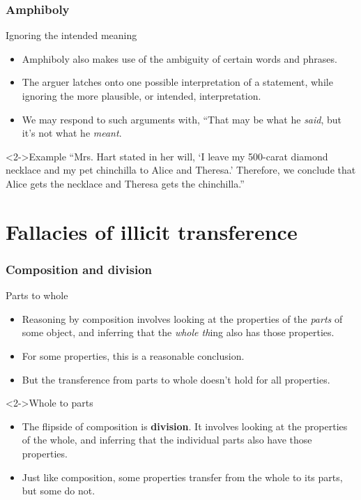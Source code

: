 \documentclass[10pt,letterpaper,xcolor=dvipsnames]{beamer}
\begin{document}
\begin{frame}
  \frametitle{Amphiboly}
  
  \begin{block}{Ignoring the intended meaning}
    \begin{itemize}
      \item Amphiboly also makes use of the ambiguity of certain words and phrases.
      \item The arguer latches onto one possible interpretation of a statement, while ignoring the more plausible, or intended, interpretation.
      \item We may respond to such arguments with, ``That may be what he \textit{said}, but it's not what he \textit{meant}.
    \end{itemize}
  \end{block}
  
  \begin{block}<2->{Example}
    ``Mrs. Hart stated in her will, `I leave my 500-carat diamond necklace and my pet chinchilla to Alice and Theresa.' Therefore, we conclude that Alice gets the necklace and Theresa gets the chinchilla.''
  \end{block}

  
\end{frame}


\section{Fallacies of illicit transference}

\begin{frame}
  \frametitle{Composition and division}
  
  \begin{block}{Parts to whole}
    \begin{itemize}
      \item Reasoning by composition involves looking at the properties of the \textit{parts} of some object, and inferring that the \textit{whole th}ing also has those properties.
      \item For some properties, this is a reasonable conclusion.
      \item But the transference from parts to whole doesn't hold for all properties.
    \end{itemize}
  \end{block}
  
  \begin{block}<2->{Whole to parts}
    \begin{itemize}
      \item The flipside of composition is \textbf{division}.  It involves looking at the properties of the whole, and inferring that the individual parts also have those properties.
      \item Just like composition, some properties transfer from the whole to its parts, but some do not.
    \end{itemize}
  \end{block}
  
\end{frame}
\end{document}
